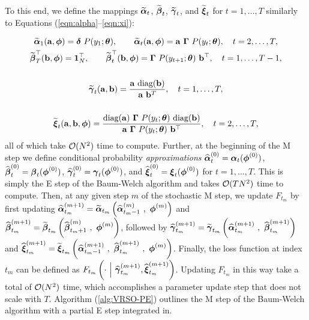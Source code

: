 To this end, we define the mappings $\widetilde {\boldsymbol{\alpha}}_t$, $\widetilde {\boldsymbol{\beta}}_t$, $\widetilde {\boldsymbol{\gamma}}_t$, and $\widetilde {\boldsymbol{\xi}}_t$ for $t = 1,\ldots,T$ similarly to Equations (\ref{eqn:alpha}--\ref{eqn:xi}):

\begin{gather}
    \widetilde {\boldsymbol{\alpha}}_1(\mathbf{a},\boldsymbol{\phi}) = \boldsymbol{\delta} ~ P(y_1;\boldsymbol{\theta}), \qquad \widetilde {\boldsymbol{\alpha}}_t(\mathbf{a},\boldsymbol{\phi}) = \mathbf{a} ~ \boldsymbol{\Gamma} ~ P(y_t;\boldsymbol{\theta}), \quad t = 2,\ldots,T, \label{eqn:tilde_alpha} \\
    \widetilde {\boldsymbol{\beta}}^\top_T(\mathbf{b},\boldsymbol{\phi}) = \mathbf{1}_N^\top, \qquad \widetilde {\boldsymbol{\beta}}^\top_t(\mathbf{b},\boldsymbol{\phi}) = \boldsymbol{\Gamma} ~ P(y_{t+1};\boldsymbol{\theta}) ~ \mathbf{b}^\top, \quad t = 1,\ldots,T-1, \label{eqn:tilde_beta} \\ \nonumber \\
    \widetilde {\boldsymbol{\gamma}}_t(\mathbf{a},\mathbf{b}) = \frac{\mathbf{a} ~ \text{diag}(\mathbf{b})}{\mathbf{a} ~ \mathbf{b}^T}, \quad t = 1,\ldots,T, \label{eqn:tilde_gamma} \\ \nonumber \\
    \widetilde {\boldsymbol{\xi}}_{t}(\mathbf{a},\mathbf{b},\boldsymbol{\phi}) = \frac{\text{diag}(\mathbf{a}) ~ \boldsymbol{\Gamma} ~ P(y_t;\boldsymbol{\theta}) ~ \text{diag}(\mathbf{b})}{\mathbf{a} ~ \boldsymbol{\Gamma} ~ P(y_{t};\boldsymbol{\theta}) ~ \mathbf{b}^\top}, \quad t = 2,\ldots,T \label{eqn:tilde_xi},
\end{gather}
%
all of which take $\mathcal{O}(N^2)$ time to compute. Further, at the beginning of the M step we define conditional probability \textit{approximations} $\widehat {\boldsymbol{\alpha}}_{t}^{(0)} = \boldsymbol{\alpha}_t(\boldsymbol{\phi}^{(0)})$, $\widehat {\boldsymbol{\beta}}_{t}^{(0)} = \boldsymbol{\beta}_t(\boldsymbol{\phi}^{(0)})$, $\widehat {\boldsymbol{\gamma}}_{t}^{(0)} = \boldsymbol{\gamma}_t(\boldsymbol{\phi}^{(0)})$, and $\widehat {\boldsymbol{\xi}}_{t}^{(0)} = \boldsymbol{\xi}_t(\boldsymbol{\phi}^{(0)})$ for $t = 1,\ldots,T$. This is simply the E step of the Baum-Welch algorithm and takes $\mathcal{O}(TN^2)$ time to compute. Then, at any given step $m$ of the stochastic M step, we update $F_{t_m}$ by first updating $\widehat {\boldsymbol{\alpha}}_{t_m}^{(m+1)} = \widetilde {\boldsymbol{\alpha}}_{t_m}\left(\widehat {\boldsymbol{\alpha}}_{t_m-1}^{(m)} ~,~ \boldsymbol{\phi}^{(m)}\right)$ and $\widehat {\boldsymbol{\beta}}_{t_m}^{(m+1)} = \widetilde {\boldsymbol{\beta}}_{t_m}\left(\widehat {\boldsymbol{\beta}}_{t_m+1}^{(m)} ~,~ \boldsymbol{\phi}^{(m)}\right)$, followed by $\widehat {\boldsymbol{\gamma}}_{t_m}^{(m+1)} = \widetilde {\boldsymbol{\gamma}}_{t_m}\left(\widehat {\boldsymbol{\alpha}}_{t_m}^{(m+1)} ~,~ \widehat {\boldsymbol{\beta}}_{t_m}^{(m+1)}\right)$ and $\widehat {\boldsymbol{\xi}}_{t_m}^{(m+1)} = \widetilde {\boldsymbol{\xi}}_{t_m}\left(\widehat {\boldsymbol{\alpha}}_{t_m-1}^{(m+1)} ~,~ \widehat {\boldsymbol{\beta}}_{t_m}^{(m+1)} ~,~ \boldsymbol{\phi}^{(m)}\right)$. Finally, the loss function at index $t_m$ can be defined as $F_{t_m}\left(\cdot ~ \Big | ~ \widehat {\boldsymbol{\gamma}}_{t_m}^{(m+1)},\widehat {\boldsymbol{\xi}}_{t_m}^{(m+1)}\right)$. Updating $F_{t_m}$ in this way take a total of $\mathcal{O}(N^2)$ time, which accomplishes a parameter update step that does not scale with $T$. Algorithm (\ref{alg:VRSO-PE}) outlines the M step of the Baum-Welch algorithm with a partial E step integrated in. %

